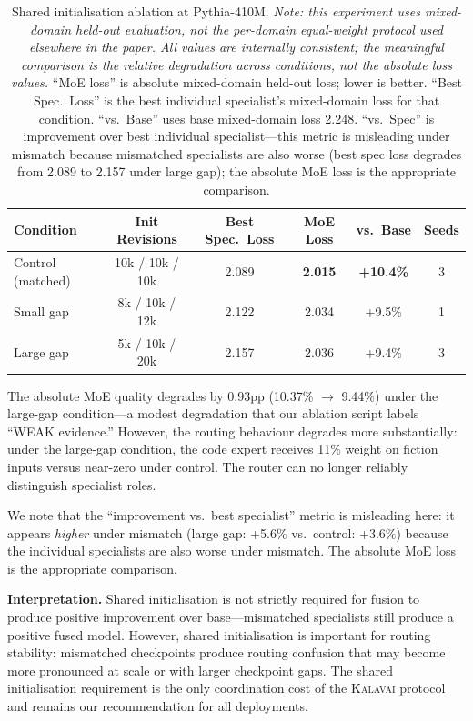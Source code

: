 \documentclass{article}
\newcommand{\kalavai}{\textsc{Kalavai}\xspace}
\begin{document}
\begin{table}[h]
\centering
\caption{Shared initialisation ablation at Pythia-410M. \emph{Note: this experiment uses mixed-domain held-out evaluation, not the per-domain equal-weight protocol used elsewhere in the paper. All values are internally consistent; the meaningful comparison is the relative degradation across conditions, not the absolute loss values.} ``MoE loss'' is absolute mixed-domain held-out loss; lower is better. ``Best Spec.\ Loss'' is the best individual specialist's mixed-domain loss for that condition. ``vs.\ Base'' uses base mixed-domain loss 2.248. ``vs.\ Spec'' is improvement over best individual specialist---this metric is misleading under mismatch because mismatched specialists are also worse (best spec loss degrades from 2.089 to 2.157 under large gap); the absolute MoE loss is the appropriate comparison.}
\label{tab:sharedinit}
\begin{tabular}{lccccc}
\toprule
\textbf{Condition} & \textbf{Init Revisions} & \textbf{Best Spec.\ Loss} & \textbf{MoE Loss} & \textbf{vs.\ Base} & \textbf{Seeds} \\
\midrule
Control (matched)  & 10k / 10k / 10k         & 2.089          & \textbf{2.015} & \textbf{+10.4\%} & 3 \\
Small gap          & 8k / 10k / 12k          & 2.122          & 2.034          & +9.5\%           & 1 \\
Large gap          & 5k / 10k / 20k          & 2.157          & 2.036          & +9.4\%           & 3 \\
\bottomrule
\end{tabular}
\end{table}

The absolute MoE quality degrades by 0.93pp (10.37\% $\rightarrow$ 9.44\%) under the large-gap condition---a modest degradation that our ablation script labels ``WEAK evidence.'' However, the routing behaviour degrades more substantially: under the large-gap condition, the code expert receives 11\% weight on fiction inputs versus near-zero under control. The router can no longer reliably distinguish specialist roles.

We note that the ``improvement vs.\ best specialist'' metric is misleading here: it appears \emph{higher} under mismatch (large gap: +5.6\% vs.\ control: +3.6\%) because the individual specialists are also worse under mismatch. The absolute MoE loss is the appropriate comparison.

\textbf{Interpretation.} Shared initialisation is not strictly required for fusion to produce positive improvement over base---mismatched specialists still produce a positive fused model. However, shared initialisation is important for routing stability: mismatched checkpoints produce routing confusion that may become more pronounced at scale or with larger checkpoint gaps. The shared initialisation requirement is the only coordination cost of the \kalavai protocol and remains our recommendation for all deployments.
\end{document}
